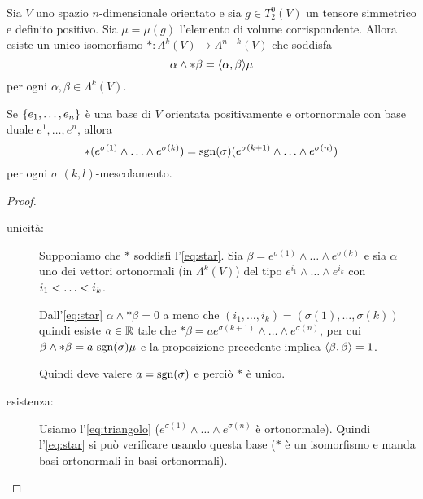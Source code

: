 \begin{proposition}
	Sia $V$ uno spazio $n$-dimensionale orientato e sia $g\in T^0_2(V)$ un tensore simmetrico e definito positivo.
	Sia $\mu=\mu(g)$ l'elemento di volume corrispondente.
	Allora esiste un unico isomorfismo $*:\Lambda^k(V) \to \Lambda^{n-k}(V)$ che soddisfa
	\begin{equation} \label{eq:star}
	 \alpha \wedge * \beta= \Scal \alpha\beta \mu
	\end{equation}
	per ogni $\alpha,\beta \in\Lambda^k(V)$.
	
	Se $\{\seqb en, \}$ è una base di $V$ orientata positivamente e ortornormale con base duale $e^1, \dots ,e^n$, allora
	\begin{equation}\label{eq:triangolo}
	*(e^{\sigma(1)}\wedge\ldots\wedge e^{\sigma(k)}) = \sgn(\sigma) (e^{\sigma(k+1)}\wedge\ldots\wedge e^{\sigma(n)})
	\end{equation}
	per ogni $\sigma$ $(k,l)$-mescolamento.
\end{proposition}
\begin{proof}
	\begin{description}
		\item [unicità:] Supponiamo che $*$ soddisfi l'\cref{eq:star}. Sia $\beta = e^{\sigma(1)} \wedge\ldots\wedge e^{\sigma(k)}$ e sia $\alpha$ uno dei vettori ortonormali (in $\Lambda^k(V)$) del tipo $e^{i_1}\wedge\ldots\wedge e^{i_k}$ con $\seqb ik<$.
		
		Dall'\cref{eq:star} $\alpha \wedge * \beta=0$ a meno che $(i_1, \ldots,i_k)=(\sigma(1),\ldots,\sigma(k))$
		quindi esiste $a\in\R$ tale che $*\beta = a e^{\sigma(k+1)} \wedge\ldots\wedge e^{\sigma(n)}$, per cui $\beta\wedge * \beta = a\ \sgn(\sigma) \mu$ e la proposizione precedente implica $\Scal \beta\beta=1$.
		
		Quindi deve valere $a = \sgn(\sigma)$ e perciò $*$ è unico.
		
		\item [esistenza:] Usiamo l'\cref{eq:triangolo} ($e^{\sigma(1)}\wedge\ldots\wedge e^{\sigma(n)}$ è ortonormale). Quindi l'\cref{eq:star} si può verificare usando questa base ($*$ è un isomorfismo e manda basi ortonormali in basi ortonormali).
	\end{description}
\end{proof}

